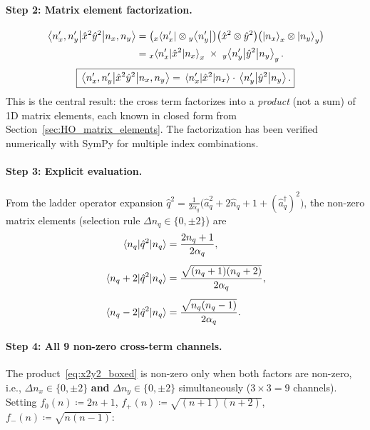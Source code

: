 \paragraph{Step 2: Matrix element factorization.}
\begin{align}\label{eq:x2y2_mel}
    \mel{n'_x, n'_y}{\hat{x}^2\hat{y}^2}{n_x, n_y}
    &= \bigl({}_x\!\bra{n'_x} \otimes {}_y\!\bra{n'_y}\bigr)
       \bigl(\hat{x}^2 \otimes \hat{y}^2\bigr)
       \bigl(\ket{n_x}_x \otimes \ket{n_y}_y\bigr) \notag\\
    &= {}_x\!\mel{n'_x}{\hat{x}^2}{n_x}_x
       \;\times\;
       {}_y\!\mel{n'_y}{\hat{y}^2}{n_y}_y.
\end{align}
\begin{equation}\label{eq:x2y2_boxed}
    \boxed{
    \mel{n'_x, n'_y}{\hat{x}^2\hat{y}^2}{n_x, n_y}
    = \mel{n'_x}{\hat{x}^2}{n_x} \cdot \mel{n'_y}{\hat{y}^2}{n_y}.
    }
\end{equation}
This is the central result: the cross term factorizes into a \emph{product}
(not a sum) of 1D matrix elements, each known in closed form from
Section~\ref{sec:HO_matrix_elements}.  The factorization has been verified
numerically with SymPy for multiple index combinations.

\paragraph{Step 3: Explicit evaluation.}
From the ladder operator expansion
$\hat{q}^2 = \tfrac{1}{2\alpha_q}\bigl(\hat{a}_q^2 + 2\hat{n}_q + 1
+ (\hat{a}_q^\dagger)^2\bigr)$, the non-zero matrix elements
(selection rule $\Delta n_q \in \{0,\pm 2\}$) are
\begin{align}
    \mel{n_q}{\hat{q}^2}{n_q} &= \frac{2n_q + 1}{2\alpha_q},
    \label{eq:q2_diag_md} \\[4pt]
    \mel{n_q + 2}{\hat{q}^2}{n_q} &= \frac{\sqrt{(n_q+1)(n_q+2)}}{2\alpha_q},
    \label{eq:q2_up_md} \\[4pt]
    \mel{n_q - 2}{\hat{q}^2}{n_q} &= \frac{\sqrt{n_q(n_q-1)}}{2\alpha_q}.
    \label{eq:q2_down_md}
\end{align}

\paragraph{Step 4: All 9 non-zero cross-term channels.}
The product~\eqref{eq:x2y2_boxed} is non-zero only when both factors are
non-zero, i.e., $\Delta n_x \in \{0, \pm 2\}$ \textbf{and}
$\Delta n_y \in \{0, \pm 2\}$ simultaneously ($3 \times 3 = 9$ channels).
Setting $f_0(n) \coloneqq 2n+1$, $f_+(n) \coloneqq \sqrt{(n+1)(n+2)}$,
$f_-(n) \coloneqq \sqrt{n(n-1)}$:


